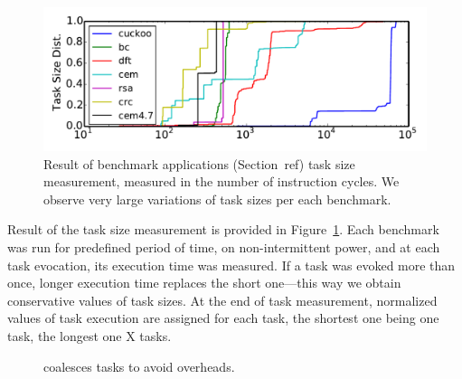\begin{figure}
	\centering
	\includegraphics[width=\columnwidth]{figures/TskDist.pdf}
	\caption{Result of benchmark applications (Section~ref{}) task size measurement, measured in the number of instruction cycles. We observe very large variations of task sizes per each benchmark. }
\label{fig:task_profiling}
\end{figure}

Result of the task size measurement is provided in Figure~\ref{fig:task_profiling}. Each benchmark was run for predefined period of time, on non-intermittent power, and at each task evocation, its execution time was measured. If a task was evoked more than once, longer execution time replaces the short one---this way we obtain conservative values of task sizes. At the end of task measurement, normalized values of task execution are assigned for each task, the shortest one being one task, the longest one X tasks.

\begin{figure}
	\centering
	\caption{\sys coalesces tasks to avoid overheads.}
	\label{fig:coalescing_example}
\end{figure}

